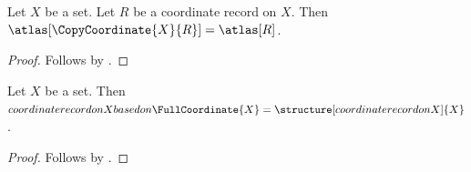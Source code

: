 \begin{proposition}\label{copy_coordinate_projection}
    Let $X$ be a set.
    Let $R$ be a coordinate record on $X$.
    Then $\atlas[\CopyCoordinate{X}{R}]=\atlas[R]$.
\end{proposition}
\begin{proof}
    Follows by .
\end{proof}

\begin{proposition}\label{full_coordinate_reconstruction}
    Let $X$ be a set.
    Then $coordinate record on X based on \FullCoordinate{X}
        =\structure[coordinate record on X]{X}$.
\end{proposition}
\begin{proof}
    Follows by .
\end{proof}
